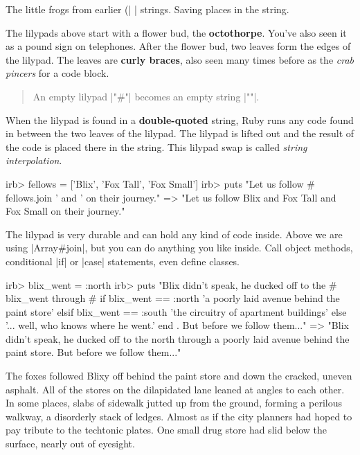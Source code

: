 \documentclass[12pt,twoside]{report}
\begin{document}
The little frogs from earlier (\rubyinline|%
\rubyinline|%
strings.  Saving places in the string.

The lilypads above start with a flower bud, the {\bf octothorpe}.
You've also seen it as a pound sign on telephones.  After the flower
bud, two leaves form the edges of the lilypad.  The leaves are {\bf
  curly braces}, also seen many times before as the {\em crab pincers}
for a code block.

\begin{quote}
An empty lilypad \rubyinline|"#{}"| becomes an empty
string \rubyinline|""|.\end{quote}


When the lilypad is found in a {\bf double-quoted} string, Ruby runs
any code found in between the two leaves of the lilypad.  The lilypad
is lifted out and the result of the code is placed there in the
string.  This lilypad swap is called {\em string interpolation}.


\begin{consolecode}

 irb> fellows = ['Blix', 'Fox Tall', 'Fox Small']
 irb> puts "Let us follow #{ fellows.join ' and ' } on their journey."
   => "Let us follow Blix and Fox Tall and Fox Small on their journey."

\end{consolecode}


The lilypad is very durable and can hold any kind of code inside.
Above we are using \rubyinline|Array#join|, but you
can do anything you like inside.  Call object methods, conditional
\rubyinline|if| or \rubyinline|case|
statements, even define classes.


\begin{consolecode}

 irb> blix_went = :north
 irb> puts "Blix didn't speak, he ducked off to the #{ blix_went } through #{
             if blix_went == :north
               'a poorly laid avenue behind the paint store'
             elsif blix_went == :south
               'the circuitry of apartment buildings'
             else
               '... well, who knows where he went.'
             end }.  But before we follow them..."
 => "Blix didn't speak, he ducked off to the north through a poorly laid avenue
     behind the paint store.  But before we follow them..."

\end{consolecode}


The foxes followed Blixy off behind the paint store and down the
cracked, uneven asphalt. All of the stores on the dilapidated lane
leaned at angles to each other.  In some places, slabs of sidewalk
jutted up from the ground, forming a perilous walkway, a disorderly
stack of ledges.  Almost as if the city planners had hoped to pay
tribute to the techtonic plates.  One small drug store had slid below
the surface, nearly out of eyesight.
\end{document}
